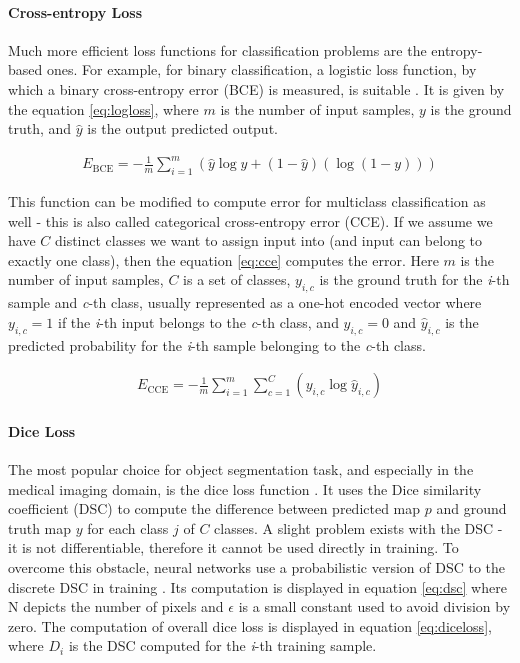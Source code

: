 \paragraph{Cross-entropy Loss}
Much more efficient loss functions for classification problems are the entropy-based ones. For example, for binary classification, a logistic loss function, by which a binary cross-entropy error (BCE) is measured, is suitable \cite{Santosh2022-2}. It is given by the equation \ref{eq:logloss}, where $m$ is the number of input samples, $y$ is the ground truth, and $\hat{y}$ is the output predicted output.

\begin{align}
\label{eq:logloss}
    E_\text{BCE} = -\frac{1}{m}\sum_{i=1}^m(\hat{y}\log{y}+(1-\hat{y})(\log{(1-y)}))
\end{align}

This function can be modified to compute error for multiclass classification as well - this is also called categorical cross-entropy error (CCE). If we assume we have $C$ distinct classes we want to assign input into (and input can belong to exactly one class), then the equation \ref{eq:cce} computes the error. Here $m$ is the number of input samples, $C$ is a set of classes, $y_{i,c}$ is the ground truth for the \textit{i}-th sample and \textit{c}-th class, usually represented as a one-hot encoded vector where $y_{i,c}=1$ if the \textit{i}-th input belongs to the \textit{c}-th class, and $y_{i,c}=0$ and $\hat{y}_{i,c}$ is the predicted probability for the \textit{i}-th sample belonging to the \textit{c}-th class.

\begin{align}
\label{eq:cce}
    E_\text{CCE} = -\frac{1}{m}\sum_{i=1}^m\sum_{c=1}^C(y_{i,c}\log{\hat{y}_{i,c}})
\end{align}

\paragraph{Dice Loss}
The most popular choice for object segmentation task, and especially in the medical imaging domain, is the dice loss function \cite{Zhang2021}. It uses the Dice similarity coefficient (DSC) to compute the difference between predicted map $p$ and ground truth map $y$ for each class $j$ of $C$ classes. A slight problem exists with the DSC - it is not differentiable, therefore it cannot be used directly in training. To overcome this obstacle, neural networks use a probabilistic version of DSC to the discrete DSC in training \cite{Zhang2021}. Its computation is displayed in equation \ref{eq:dsc} where N depicts the number of pixels and $\epsilon$ is a small constant used to avoid division by zero. The computation of overall dice loss is displayed in equation \ref{eq:diceloss}, where $D_i$ is the DSC computed for the \textit{i}-th training sample.

